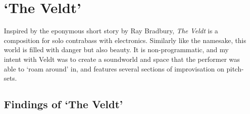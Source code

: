 \section{`The Veldt'}
Inspired by the eponymous short story by Ray Bradbury, \textit{The Veldt} is a composition for solo contrabass with electronics. Similarly like the namesake, this world is filled with danger but also beauty. It is non-programmatic, and my intent with Veldt was to create a soundworld and space that the performer was able to `roam around' in, and features several sections of improvisation on pitch-sets. \lipsum[1]

\subsection{Findings of `The Veldt'}
\lipsum[3]